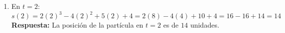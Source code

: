 \documentclass[11pt,a4paper]{article}
\begin{document}
\begin{enumerate}[leftmargin=*,itemsep=16pt,label=\textbf{Ejercicio \arabic*.}]
\begin{enumerate}[label=\alph*),itemsep=8pt]
        \item En $t = 2$:
        \[
        s(2) = 2(2)^3 - 4(2)^2 + 5(2) + 4 = 2(8) - 4(4) + 10 + 4 = 16 - 16 + 14 = 14
        \]
        {\color{respcolor}\textbf{Respuesta:}} La posición de la partícula en $t = 2$ es de $14$ unidades.
    \end{enumerate}

\end{enumerate}
\end{document}
